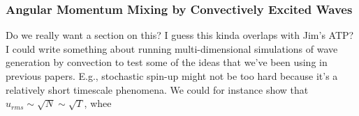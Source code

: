 {\color{purple}
\subsubsection{Angular Momentum Mixing by Convectively Excited Waves}}

Do we really want a section on this?  I guess this kinda overlaps with Jim's ATP?  I could write something about running multi-dimensional simulations of wave generation by convection to test some of the ideas that we've been using in previous papers.  E.g., stochastic spin-up might not be too hard because it's a relatively short timescale phenomena. We could for instance show that $u_{rms} \sim \sqrt{N} \sim \sqrt{T}$, whee 
